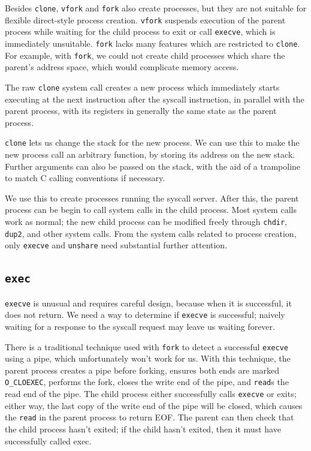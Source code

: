 \documentclass[letterpaper,twocolumn,10pt]{article}
\begin{document}
Besides \texttt{clone}, \texttt{vfork} and \texttt{fork} also create processes,
but they are not suitable for flexible direct-style process creation.
\texttt{vfork} suspends execution of the parent process
while waiting for the child process to exit or call \texttt{execve},
which is immediately unsuitable.\cite{vfork}
\texttt{fork} lacks many features which are restricted to \texttt{clone}.
For example, with \texttt{fork},
we could not create child processes which share the parent's address space,
which would complicate memory access.

The raw \texttt{clone} system call creates a new process
which immediately starts executing at the next instruction after the syscall instruction,
in parallel with the parent process,
with its registers in generally the same state as the parent process.

\texttt{clone} lets us change the stack for the new process.
We can use this to make the new process call an arbitrary function,
by storing its address on the new stack.
Further arguments can also be passed on the stack,
with the aid of a trampoline to match C calling conventions if necessary.

We use this to create processes running the syscall server.
After this,
the parent process can be begin to call system calls in the child process.
Most system calls work as normal;
the new child process can be modified freely through \texttt{chdir}, \texttt{dup2}, and other system calls.
From the system calls related to process creation,
only \texttt{execve} and \texttt{unshare} need substantial further attention.
\subsection{\texttt{exec}}\label{execve}
\texttt{execve} is unusual and requires careful design,
because when it is successful, it does not return.
We need a way to determine if \texttt{execve} is successful;
naively waiting for a response to the syscall request may leave us waiting forever.

There is a traditional technique used with \texttt{fork}
to detect a successful \texttt{execve} using a pipe,
which unfortunately won't work for us.
With this technique, the parent process creates a pipe before forking,
ensures both ends are marked \verb|O_CLOEXEC|,
performs the fork,
closes the write end of the pipe,
and \texttt{read}s the read end of the pipe.
The child process either successfully calls \texttt{execve} or exits;
either way, the last copy of the write end of the pipe will be closed,
which causes the \texttt{read} in the parent process to return EOF.
The parent can then check that the child process hasn't exited;
if the child hasn't exited, then it must have successfully called exec.
\end{document}
